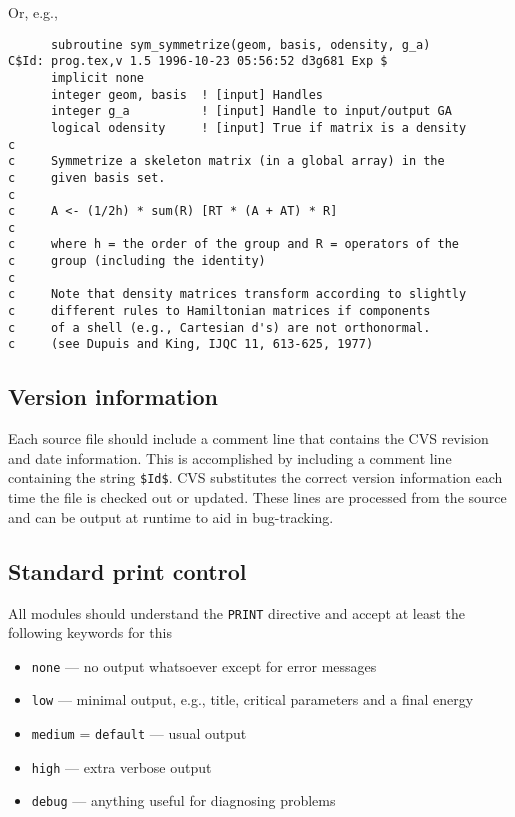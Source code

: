 Or, e.g.,
\begin{verbatim}
      subroutine sym_symmetrize(geom, basis, odensity, g_a)
C$Id: prog.tex,v 1.5 1996-10-23 05:56:52 d3g681 Exp $
      implicit none
      integer geom, basis  ! [input] Handles
      integer g_a          ! [input] Handle to input/output GA
      logical odensity     ! [input] True if matrix is a density
c
c     Symmetrize a skeleton matrix (in a global array) in the
c     given basis set.
c
c     A <- (1/2h) * sum(R) [RT * (A + AT) * R]
c
c     where h = the order of the group and R = operators of the
c     group (including the identity)
c
c     Note that density matrices transform according to slightly
c     different rules to Hamiltonian matrices if components
c     of a shell (e.g., Cartesian d's) are not orthonormal.
c     (see Dupuis and King, IJQC 11, 613-625, 1977)
\end{verbatim}


\subsection{Version information}

Each source file should include a comment line that contains the CVS
revision and date information.  This is accomplished by including a
comment line containing the string \verb+$+\verb+Id+\verb+$+.  CVS
substitutes the correct version information each time the file is
checked out or updated.  These lines are processed from the source and can be
output at runtime to aid in bug-tracking.

\subsection{Standard print control}

All modules should understand the \verb+PRINT+ directive and
accept at least the following keywords for this
\begin{itemize}
\item \verb+none+ --- no output whatsoever except for error messages
\item \verb+low+ --- minimal output, e.g., title, critical parameters
and a final energy
\item \verb+medium+ = \verb+default+ --- usual output
\item \verb+high+ --- extra verbose output
\item \verb+debug+ --- anything useful for diagnosing problems
\end{itemize}

